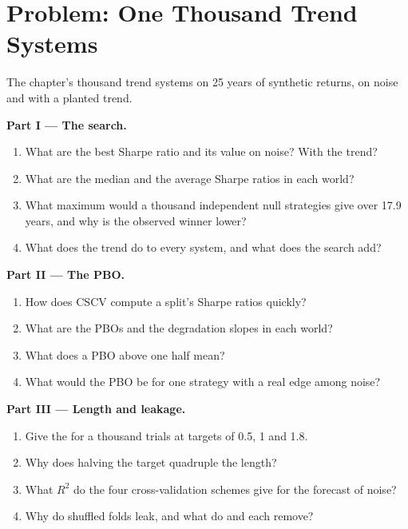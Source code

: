 \section{Problem: One Thousand Trend Systems}

\begin{problem}\label{pb:rs:overfitting:1}
The chapter's thousand trend systems on 25 years of synthetic returns, on noise and with a planted trend.

\medskip\noindent\textbf{Part I --- The search.}
\begin{enumerate}
\item What are the best  Sharpe ratio and its  value on noise? With the trend?
\item What are the median  and the average  Sharpe ratios in each world?
\item What maximum would a thousand independent null strategies give over 17.9 years, and why is the observed winner lower?
\item What does the trend do to every system, and what does the search add?
\end{enumerate}

\medskip\noindent\textbf{Part II --- The PBO.}
\begin{enumerate}[resume]
\item How does CSCV compute a split's Sharpe ratios quickly?
\item What are the PBOs and the degradation slopes in each world?
\item What does a PBO above one half mean?
\item What would the PBO be for one strategy with a real edge among noise?
\end{enumerate}

\medskip\noindent\textbf{Part III --- Length and leakage.}
\begin{enumerate}[resume]
\item Give the  for a thousand trials at targets of 0.5, 1 and 1.8.
\item Why does halving the target quadruple the length?
\item What $R^2$ do the four cross-validation schemes give for the forecast of noise?
\item Why do shuffled folds leak, and what do  and  each remove?
\end{enumerate}


\end{problem}
